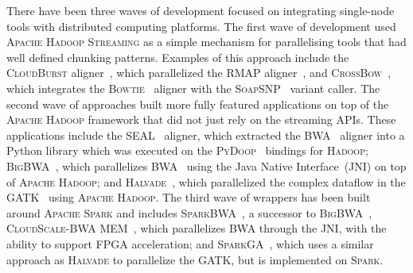 \documentclass[phd]{ucbthesis}
\begin{document}
There have been three waves of development focused on integrating single-node
tools with distributed computing platforms. The first wave of development used
\textsc{Apache Hadoop Streaming} as a simple mechanism for parallelising tools
that had well defined chunking patterns. Examples of this approach include the
\textsc{CloudBurst} aligner~\cite{schatz09}, which parallelized the
\textsc{RMAP} aligner~\cite{smith08}, and
\textsc{CrossBow}~\cite{langmead09crossbow}, which integrates the
\textsc{Bowtie}~\cite{langmead09bowtie} aligner with the
\textsc{SoapSNP}~\cite{li09snp} variant caller. The second wave of approaches
built more fully featured applications on top of the \textsc{Apache Hadoop}
framework that did not just rely on the streaming APIs. These applications
include the \textsc{SEAL}~\cite{pireddu11} aligner, which extracted the
\textsc{BWA}~\cite{li09} aligner into a Python library which was executed
on the \textsc{PyDoop}~\cite{leo10} bindings for \textsc{Hadoop};
\textsc{BigBWA}~\cite{abuin15}, which parallelizes \textsc{BWA}~\cite{li09}
using the Java Native Interface~(JNI) on top of \textsc{Apache Hadoop}; and
\textsc{Halvade}~\cite{decap15}, which parallelized the complex dataflow in
the \textsc{GATK}~\cite{depristo11} using \textsc{Apache Hadoop}. The third
wave of wrappers has been built around \textsc{Apache Spark} and includes
\textsc{SparkBWA}~\cite{abuin16}, a successor to \textsc{BigBWA}~\cite{abuin15},
\textsc{CloudScale-BWA MEM}~\cite{chen16}, which parallelizes
\textsc{BWA} through the JNI, with the ability to support \textsc{FPGA}
acceleration; and \textsc{SparkGA}~\cite{mushtaq17}, which uses a similar
approach as \textsc{Halvade} to parallelize the \textsc{GATK}, but is
implemented on \textsc{Spark}.
\end{document}
